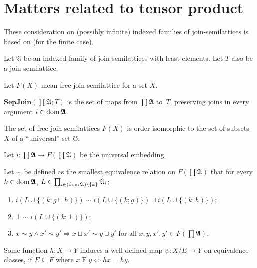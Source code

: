\chapter{Matters related to tensor product}

These consideration on (possibly infinite) indexed families of
join-semilattices is based on \cite{nforum-todd-tensor} (for the finite case).

Let $\mathfrak{A}$ be an indexed family of join-semilattices with least
elements. Let $T$ also be a join-semilattice.

Let $F (X)$ mean free join-semilattice for a set $X$.

\begin{defn}
$\mathbf{SepJoin}(\prod\mathfrak{A};T)$ is the set of maps from $\prod\mathfrak{A}$
to~$T$, preserving joins in every argument $i\in\operatorname{dom}\mathfrak{A}$.
\end{defn}

\begin{obvious}
The set of free join-semilattices $F (X)$ is order-isomorphic to the set of
subsets $X$ of a ``universal'' set $\mho$.{\hspace*{\fill}}{\medskip}
\end{obvious}

Let $i : \prod \mathfrak{A} \rightarrow F \left( \prod \mathfrak{A} \right)$
be the universal embedding.

Let $\sim$ be defined as the smallest equivalence relation on $F \left( \prod
\mathfrak{A} \right)$ that for every $k \in \operatorname{dom} \mathfrak{A}$, $L \in
\prod_{i \in (\operatorname{dom} \mathfrak{A}) \setminus \{ k \}} \mathfrak{A}_i$:
\begin{enumerate}
  \item $i (L \cup \{ (k ; g \sqcup h) \}) \sim i (L \cup \{ (k ; g) \})
  \sqcup i (L \cup \{ (k ; h) \})$;
  
  \item $\bot \sim i (L \cup \{ (k ; \bot) \})$;
  
  \item $x \sim y \wedge x' \sim y' \Rightarrow x \sqcup x' \sim y \sqcup y'$
  for all $x, y, x', y' \in F \left( \prod \mathfrak{A} \right)$.
\end{enumerate}

\begin{obvious}
Some function $h : X \rightarrow Y$ induces a well defined map $\psi : X / E
\rightarrow Y$ on equivalence classes, if $E \subseteq F$ where $x \mathrel{F}
y \Leftrightarrow h x = h y$.{\hspace*{\fill}}{\medskip}
\end{obvious}

